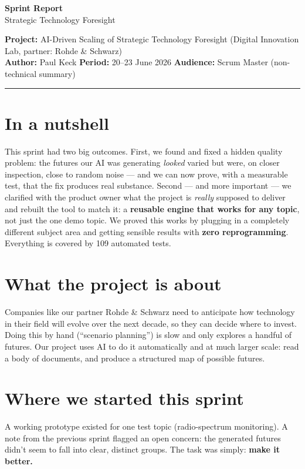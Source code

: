 \documentclass[11pt,a4paper]{article}
\begin{document}
\begin{center}
  {\LARGE\bfseries\color{accent} Sprint Report}\\[3pt]
  {\large Strategic Technology Foresight}
\end{center}
\vspace{2pt}

\noindent\textbf{Project:} AI-Driven Scaling of Strategic Technology Foresight
(Digital Innovation Lab, partner: Rohde \& Schwarz)\\[2pt]
\textbf{Author:} Paul Keck \quad\textbullet\quad \textbf{Period:} 20--23 June 2026
\quad\textbullet\quad \textbf{Audience:} Scrum Master (non-technical summary)

\vspace{-1ex}
\noindent\textcolor{accent}{\rule{\linewidth}{0.7pt}}

\section{In a nutshell}
This sprint had two big outcomes. First, we found and fixed a hidden quality problem: the
futures our AI was generating \emph{looked} varied but were, on closer inspection, close to
random noise --- and we can now prove, with a measurable test, that the fix produces real
substance. Second --- and more important --- we clarified with the product owner what the
project is \emph{really} supposed to deliver and rebuilt the tool to match it: a
\textbf{reusable engine that works for any topic}, not just the one demo topic. We proved this
works by plugging in a completely different subject area and getting sensible results with
\textbf{zero reprogramming}. Everything is covered by 109 automated tests.

\section{What the project is about}
Companies like our partner Rohde \& Schwarz need to anticipate how technology in their field
will evolve over the next decade, so they can decide where to invest. Doing this by hand
(``scenario planning'') is slow and only explores a handful of futures. Our project uses AI to
do it automatically and at much larger scale: read a body of documents, and produce a
structured map of possible futures.

\section{Where we started this sprint}
A working prototype existed for one test topic (radio-spectrum monitoring). A note from the
previous sprint flagged an open concern: the generated futures didn't seem to fall into clear,
distinct groups. The task was simply: \textbf{make it better.}
\end{document}
